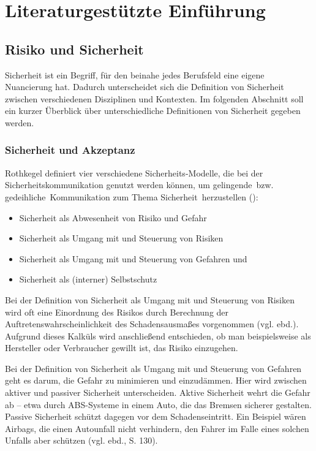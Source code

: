 \section{Literaturgestützte Einführung}

\subsection{Risiko und Sicherheit}
Sicherheit ist ein Begriff, für den beinahe jedes Berufsfeld eine eigene Nuancierung hat. Dadurch unterscheidet sich die Definition von Sicherheit zwischen verschiedenen Disziplinen und Kontexten. Im folgenden Abschnitt soll ein kurzer Überblick über unterschiedliche Definitionen von Sicherheit gegeben werden.

\subsubsection*{Sicherheit und Akzeptanz}

Rothkegel definiert vier verschiedene Sicherheits-Modelle, die bei der Sicherheitskommunikation genutzt werden können, um \glqq \glq gelingende\grq \, bzw. \glq gedeihliche\grq \, Kommunikation zum Thema Sicherheit\grqq \, herzustellen (\cite[125]{rothkegel2013sicherheitskommunikation}):
\begin{itemize}
  \item Sicherheit als Abwesenheit von Risiko und Gefahr
  \item Sicherheit als Umgang mit und Steuerung von Risiken
  \item Sicherheit als Umgang mit und Steuerung von Gefahren und
  \item Sicherheit als (interner) Selbstschutz
\end{itemize}

Bei der Definition von Sicherheit als Umgang mit und Steuerung von Risiken wird oft eine Einordnung des Risikos durch Berechnung der Auftretenswahrscheinlichkeit des Schadensausmaßes vorgenommen (vgl. ebd.). Aufgrund dieses Kalküls wird anschließend entschieden, ob man beispielsweise als Hersteller oder Verbraucher gewillt ist, das Risiko einzugehen.

Bei der Definition von Sicherheit als Umgang mit und Steuerung von Gefahren geht es darum, die Gefahr zu minimieren und einzudämmen. Hier wird zwischen aktiver und passiver Sicherheit unterscheiden. Aktive Sicherheit wehrt die Gefahr ab -- etwa durch ABS-Systeme in einem Auto, die das Bremsen sicherer gestalten. Passive Sicherheit schützt dagegen vor dem Schadenseintritt. Ein Beispiel wären Airbags, die einen Autounfall nicht verhindern, den Fahrer im Falle eines solchen Unfalls aber schützen (vgl. ebd., S. 130).

